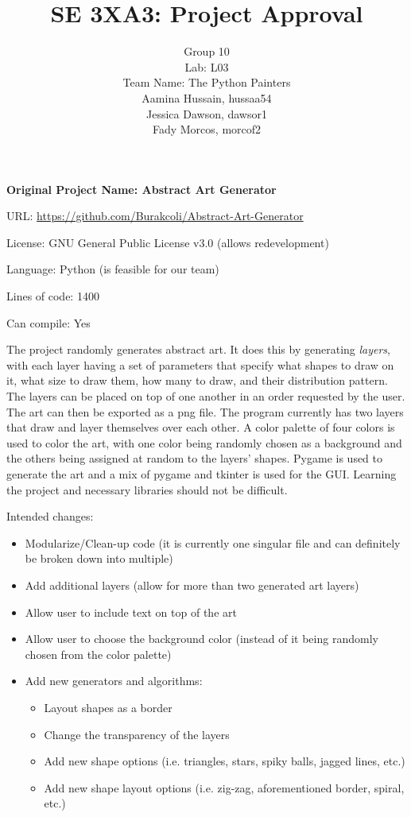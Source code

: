 \documentclass{article}
\title{SE 3XA3: Project Approval}
\author{Group 10 \\ Lab: L03\\
Team Name: The Python Painters \\
Aamina Hussain, hussaa54 \\
Jessica Dawson, dawsor1 \\
Fady Morcos, morcof2}
\date{}
\begin{document}
\maketitle

\noindent \textbf{Original Project Name: Abstract Art Generator}

\noindent URL: \url{https://github.com/Burakcoli/Abstract-Art-Generator}

\noindent License: GNU General Public License v3.0 (allows redevelopment)

\noindent Language: Python (is feasible for our team)

\noindent Lines of code: 1400

\noindent Can compile: Yes \newline

    The project randomly generates abstract art. It does this by generating \emph{layers}, with each layer having a set of parameters that specify what shapes to draw on it, what size to draw them, how many to draw, and their distribution pattern. The layers can be placed on top of one another in an order requested by the user. The art can then be exported as a png file. The program currently has two layers that draw and layer themselves over each other. A color palette of four colors is used to color the art, with one color being randomly chosen as a background and the others being assigned at random to the layers’ shapes. Pygame is used to generate the art and a mix of pygame and tkinter is used for the GUI. Learning the project and necessary libraries should not be difficult.\newline

Intended changes:
\begin{itemize}
    \item Modularize/Clean-up code (it is currently one singular file and can definitely be broken down into multiple)
    \item Add additional layers (allow for more than two generated art layers)
    \item Allow user to include text on top of the art
    \item Allow user to choose the background color (instead of it being randomly chosen from the color palette)
    \item Add new generators and algorithms:
    \begin{itemize}
        \item Layout shapes as a border
        \item Change the transparency of the layers
        \item Add new shape options (i.e. triangles, stars, spiky balls, jagged lines, etc.)
        \item Add new shape layout options (i.e. zig-zag, aforementioned border, spiral, etc.)
    \end{itemize}
\end{itemize}
\end{document}
